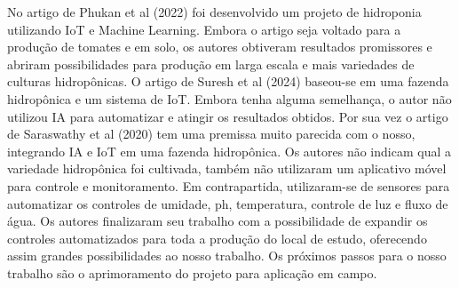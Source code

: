 No artigo de Phukan et al (2022) foi desenvolvido um projeto de hidroponia utilizando IoT e Machine Learning. Embora o artigo seja voltado para a produção de tomates e em solo, os autores obtiveram resultados promissores e abriram possibilidades para produção em larga escala e mais variedades de culturas hidropônicas. O artigo de Suresh et al (2024) baseou-se em uma fazenda hidropônica e um sistema de IoT. Embora tenha alguma semelhança, o autor não utilizou IA para automatizar e atingir os resultados obtidos.
Por sua vez o artigo de Saraswathy et al (2020) tem uma premissa muito parecida com o nosso, integrando IA e IoT em uma fazenda hidropônica. Os autores não indicam qual a variedade hidropônica foi cultivada, também não utilizaram um aplicativo móvel para controle e monitoramento. Em contrapartida, utilizaram-se de sensores para automatizar os controles de umidade, ph, temperatura, controle de luz e fluxo de água. Os autores finalizaram seu trabalho com a possibilidade de expandir os controles automatizados para toda a produção do local de estudo, oferecendo assim grandes possibilidades ao nosso trabalho. 
Os próximos passos para o nosso trabalho são o aprimoramento do projeto para aplicação em campo.